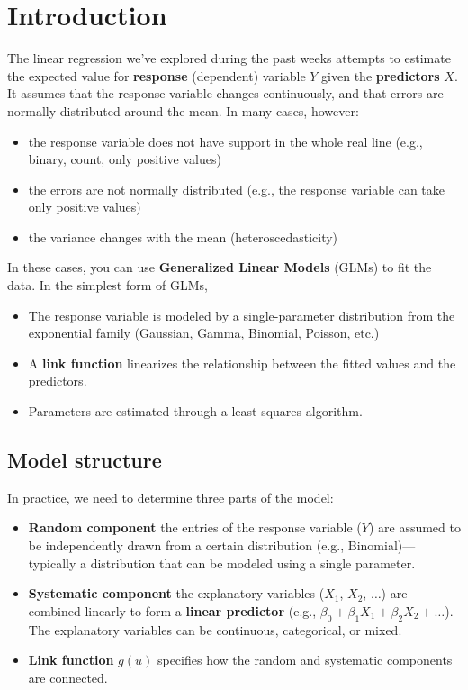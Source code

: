 \documentclass[
  letterpaper,
  DIV=11,
  numbers=noendperiod]{scrreprt}
\providecommand{\tightlist}{%
  \setlength{\itemsep}{0pt}\setlength{\parskip}{0pt}}\usepackage{longtable,booktabs,array}
\begin{document}
\hypertarget{introduction}{%
\section{Introduction}\label{introduction}}

The linear regression we've explored during the past weeks attempts to
estimate the expected value for \textbf{response} (dependent) variable
\(Y\) given the \textbf{predictors} \(X\). It assumes that the response
variable changes continuously, and that errors are normally distributed
around the mean. In many cases, however:

\begin{itemize}
\tightlist
\item
  the response variable does not have support in the whole real line
  (e.g., binary, count, only positive values)
\item
  the errors are not normally distributed (e.g., the response variable
  can take only positive values)
\item
  the variance changes with the mean (heteroscedasticity)
\end{itemize}

In these cases, you can use \textbf{Generalized Linear Models} (GLMs) to
fit the data. In the simplest form of GLMs,

\begin{itemize}
\tightlist
\item
  The response variable is modeled by a single-parameter distribution
  from the exponential family (Gaussian, Gamma, Binomial, Poisson, etc.)
\item
  A \textbf{link function} linearizes the relationship between the
  fitted values and the predictors.
\item
  Parameters are estimated through a least squares algorithm.
\end{itemize}

\hypertarget{model-structure}{%
\subsection{Model structure}\label{model-structure}}

In practice, we need to determine three parts of the model:

\begin{itemize}
\tightlist
\item
  \textbf{Random component} the entries of the response variable (\(Y\))
  are assumed to be independently drawn from a certain distribution
  (e.g., Binomial)---typically a distribution that can be modeled using
  a single parameter.
\item
  \textbf{Systematic component} the explanatory variables (\(X_1\),
  \(X_2\), \(\ldots\)) are combined linearly to form a \textbf{linear
  predictor} (e.g., \(\beta_0 + \beta_1 X_1 + \beta_2 X_2 + \ldots\)).
  The explanatory variables can be continuous, categorical, or mixed.
\item
  \textbf{Link function} \(g(u)\) specifies how the random and
  systematic components are connected.
\end{itemize}
\end{document}

